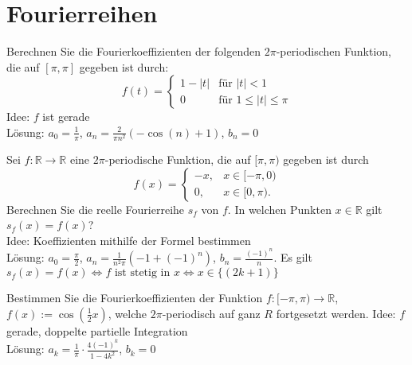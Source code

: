 \section{Fourierreihen}
Berechnen Sie die Fourierkoeffizienten der folgenden $2\pi$-periodischen Funktion, die auf $[\pi, \pi]$ gegeben ist durch:
\begin{displaymath}
  f(t) =
  \begin{cases}
    1 - |t|& \text{für } |t| < 1\\
    0& \text{für } 1 \leq |t| \leq \pi
  \end{cases}
\end{displaymath}
Idee: $f$ ist gerade\\
Lösung: $a_0 = \frac{1}{\pi}$, $a_n = \frac{2}{\pi n^2}(-\cos(n) + 1)$, $b_n = 0$

Sei $f : \mathbb{R} \to \mathbb{R}$ eine $2\pi$-periodische Funktion, die auf $[\pi, \pi)$ gegeben ist durch
\begin{displaymath}
  f(x) =
  \begin{cases}
    -x,& x \in [-\pi,0)\\
    0,& x \in [0,\pi).
  \end{cases}
\end{displaymath}
Berechnen Sie die reelle Fourierreihe $s_f$ von $f$.
In welchen Punkten $x \in \mathbb{R}$ gilt $s_f(x) = f(x)$?\\
Idee: Koeffizienten mithilfe der Formel bestimmen\\
Lösung: $a_0 = \frac{\pi}{2}$, $a_n = \frac{1}{n^2 \pi}(-1 + (-1)^n)$, $b_n = \frac{(-1)^n}{n}$.
Es gilt $s_f(x) = f(x) \iff f \text{ ist stetig in } x \iff x \in \{(2k+1)\}$

Bestimmen Sie die Fourierkoeffizienten der Funktion $f : [-\pi, \pi) \to \mathbb{R}$, $f(x) := \cos\left(\frac{1}{2}x\right)$, welche $2\pi$-periodisch auf ganz $R$ fortgesetzt werden.
Idee: $f$ gerade, doppelte partielle Integration\\
Lösung: $a_k = \frac{1}{\pi} \cdot \frac{4(-1)^k}{1-4k^2}$, $b_k = 0$